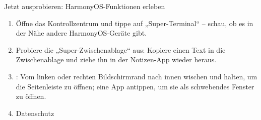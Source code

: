 \begin{tcbpractice}{Jetzt ausprobieren: HarmonyOS-Funktionen erleben}
\begin{enumerate}
  \item Öffne das Kontrollzentrum und tippe auf „Super-Terminal“ – schau, ob es in der Nähe andere HarmonyOS-Geräte gibt.
  \item Probiere die „Super-Zwischenablage“ aus: Kopiere einen Text in die Zwischenablage und ziehe ihn in der Notizen-App wieder heraus.
  \item : Vom linken oder rechten Bildschirmrand nach innen wischen und halten, um die Seitenleiste zu öffnen; eine App antippen, um sie als schwebendes Fenster zu öffnen.
  \item Datenschutz
\end{enumerate}

\end{tcbpractice}
